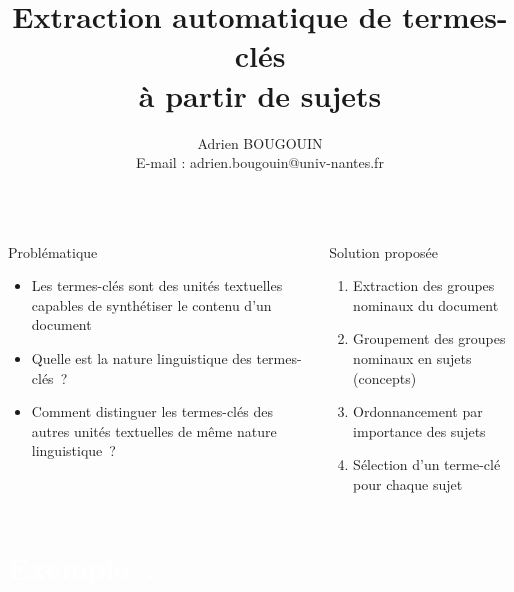 \documentclass[final, xcolor={usenames, dvipsnames}]{beamer}
\title{\Huge\textbf
  Extraction automatique de termes-clés\\à partir de sujets
}
\author{
  Adrien BOUGOUIN\\
  E-mail : adrien.bougouin@univ-nantes.fr
}
\institute{%
  Spécialité : Informatique\\ %
  Laboratoire : LINA\\        %
  \'{E}quipe : TALN           %
}
\begin{document}
  \begin{frame}[b]{}
    \begin{columns}[t]
      \begin{column}{.45\linewidth}
        \begin{block}{Problématique}
          \begin{itemize}
            \item{Les termes-clés sont des unités textuelles capables de
                  synthétiser le contenu d'un document}
            \item{Quelle est la nature linguistique des termes-clés~?}
            \item{Comment distinguer les termes-clés des autres unités
                  textuelles de même nature linguistique~?}
          \end{itemize}
        \end{block}
      \end{column}

      \begin{column}{.45\linewidth}
        \begin{block}{Solution proposée}
          \vspace{.55em}
          \begin{enumerate}
            \item{Extraction des groupes nominaux du document}
            \item{Groupement des groupes nominaux en sujets (concepts)}
            \item{Ordonnancement par importance des sujets}
            \item{Sélection d'un terme-clé pour chaque sujet}
          \end{enumerate}
          \vspace{.59em}
        \end{block}
      \end{column}
    \end{columns}

    \vspace{-1em}

    \begin{columns}[b]
      \begin{column}{.45\linewidth}
        \section{\textcolor{white}{Exemple~:}}


\end{column}
\end{columns}
\end{frame}
\end{document}
